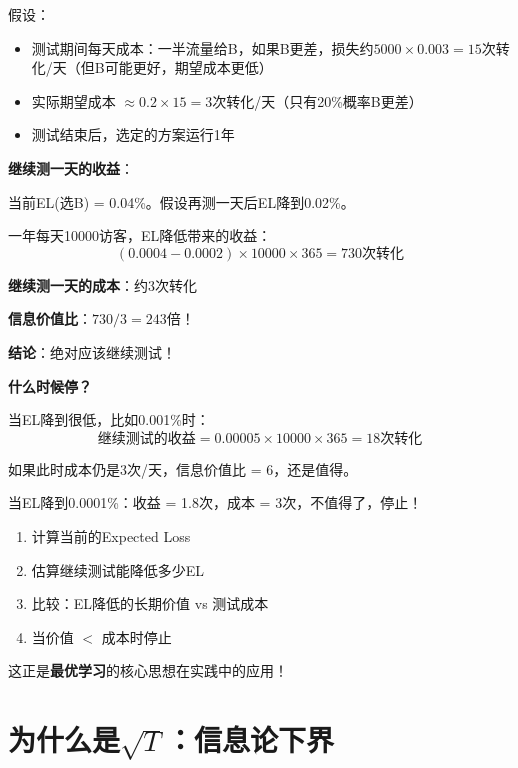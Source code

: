 \documentclass[11pt,a4paper]{article}
\theoremstyle{definition}
\begin{document}
\begin{calculation}[何时停止的完整分析]
假设：
\begin{itemize}
    \item 测试期间每天成本：一半流量给B，如果B更差，损失约$5000 \times 0.003 = 15$次转化/天（但B可能更好，期望成本更低）
    \item 实际期望成本 $\approx 0.2 \times 15 = 3$次转化/天（只有20\%概率B更差）
    \item 测试结束后，选定的方案运行1年
\end{itemize}

\textbf{继续测一天的收益}：

当前EL(选B) = 0.04\%。假设再测一天后EL降到0.02\%。

一年每天10000访客，EL降低带来的收益：
\[
(0.0004 - 0.0002) \times 10000 \times 365 = 730 \text{次转化}
\]

\textbf{继续测一天的成本}：约3次转化

\textbf{信息价值比}：$730 / 3 = 243$倍！

\textbf{结论}：绝对应该继续测试！

\textbf{什么时候停？}

当EL降到很低，比如0.001\%时：
\[
\text{继续测试的收益} = 0.00005 \times 10000 \times 365 = 18 \text{次转化}
\]

如果此时成本仍是3次/天，信息价值比 = 6，还是值得。

当EL降到0.0001\%：收益 = 1.8次，成本 = 3次，不值得了，停止！
\end{calculation}

\begin{keypoint}[A/B测试的最优停止规则]
\begin{enumerate}
    \item 计算当前的Expected Loss
    \item 估算继续测试能降低多少EL
    \item 比较：EL降低的长期价值 vs 测试成本
    \item 当价值 $<$ 成本时停止
\end{enumerate}

这正是\textbf{最优学习}的核心思想在实践中的应用！
\end{keypoint}

\section{为什么是$\sqrt{T}$：信息论下界}
\end{document}
